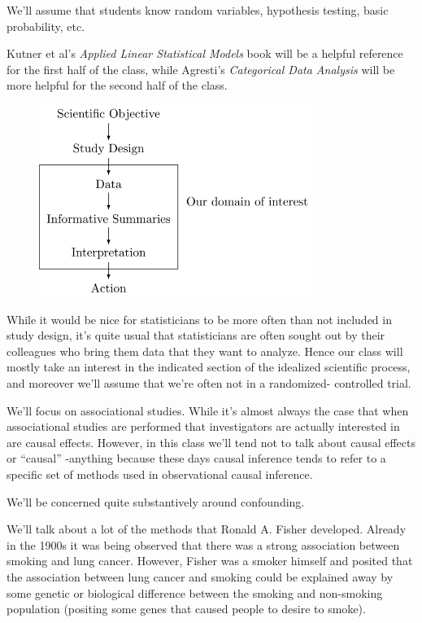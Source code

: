 \documentclass[
  letterpaper,
  DIV=11,
  numbers=noendperiod]{scrreport}
\begin{document}
We'll assume that students know random variables, hypothesis testing,
basic probability, etc.

Kutner et al's \emph{Applied Linear Statistical Models} book will be a
helpful reference for the first half of the class, while Agresti's
\emph{Categorical Data Analysis} will be more helpful for the second
half of the class.

\begin{figure}

{\centering \includegraphics[width=3.5in,height=\textheight]{week1/standalone_figures/scientific_process/scientific_process.svg}

}

\end{figure}

While it would be nice for statisticians to be more often than not
included in study design, it's quite usual that statisticians are often
sought out by their colleagues who bring them data that they want to
analyze. Hence our class will mostly take an interest in the indicated
section of the idealized scientific process, and moreover we'll assume
that we're often not in a randomized- controlled trial.

We'll focus on {associational studies}. While it's almost always the
case that when associational studies are performed that investigators
are actually interested in are {causal effects}. However, in this class
we'll tend not to talk about causal effects or ``causal'' -anything
because these days causal inference tends to refer to a specific set of
methods used in observational causal inference.

We'll be concerned quite substantively around confounding.

We'll talk about a lot of the methods that Ronald A. Fisher developed.
Already in the 1900s it was being observed that there was a strong
association between smoking and lung cancer. However, Fisher was a
smoker himself and posited that the association between lung cancer and
smoking could be explained away by some genetic or biological difference
between the smoking and non-smoking population (positing some genes that
caused people to desire to smoke).
\end{document}
